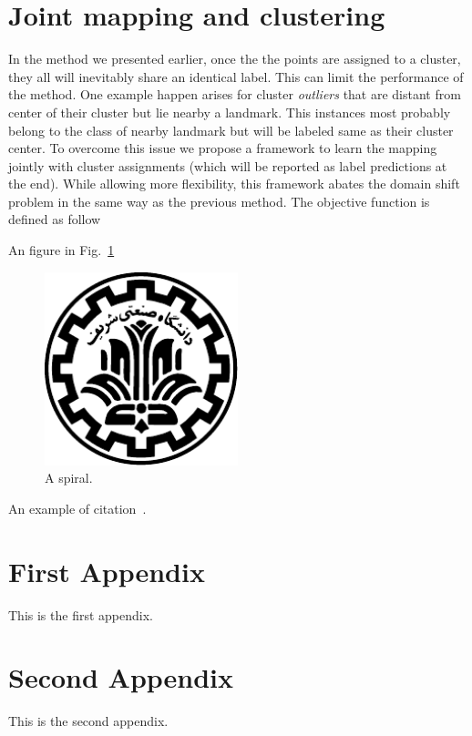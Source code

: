 \documentclass[wcp]{jmlr}
\begin{document}
\section{Joint mapping and clustering}
In the method we presented earlier, once the the points are assigned to a cluster,
they all will inevitably share an identical label. This can limit the performance of the method. One
example happen arises for cluster \textit{outliers} that are distant from center of their cluster but lie
nearby a landmark. This instances most probably belong to the class of nearby landmark but will be labeled same
as their cluster center. To overcome this issue we propose a framework to learn the mapping jointly with cluster assignments
 (which will be reported as label predictions at the end).
 While allowing more flexibility, this framework abates the domain shift problem in the same way as the previous method.
 The objective function is defined as follow

An figure in Fig.~\ref{fig:spiral}
\begin{figure}[htp]
\begin{center}
\includegraphics[width=0.5\textwidth]{../images/logo.pdf}
\caption{A spiral.}\label{fig:spiral}
\end{center}
\end{figure}

An example of citation~\cite{DBLP:conf/acml/2009}.


%


\appendix

\section{First Appendix}\label{apd:first}

This is the first appendix.

\section{Second Appendix}\label{apd:second}

This is the second appendix.
\end{document}
